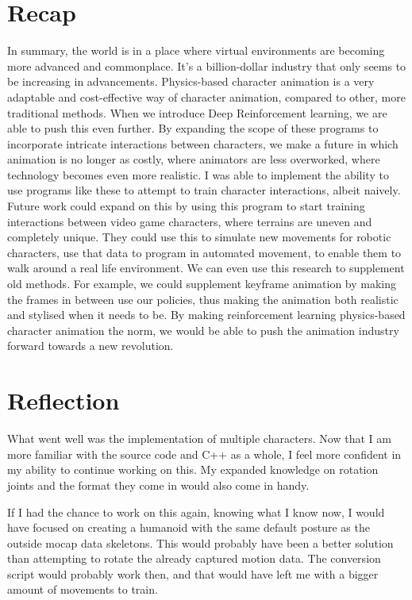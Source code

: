 \documentclass{l4proj}
\begin{document}
\section{Recap}
In summary, the world is in a place where virtual environments are becoming more advanced and commonplace. It's a billion-dollar industry that only seems to be increasing in advancements. Physics-based character animation is a very adaptable and cost-effective way of character animation, compared to other, more traditional methods. When we introduce Deep Reinforcement learning, we are able to push this even further. By expanding the scope of these programs to incorporate intricate interactions between characters, we make a future in which animation is no longer as costly, where animators are less overworked, where technology becomes even more realistic. I was able to implement the ability to use programs like these to attempt to train character interactions, albeit naively. Future work could expand on this by using this program to start training interactions between video game characters, where terrains are uneven and completely unique. They could use this to simulate new movements for robotic characters, use that data to program in automated movement, to enable them to walk around a real life environment. We can even use this research to supplement old methods. For example, we could supplement keyframe animation by making the frames in between use our policies, thus making the animation both realistic and stylised when it needs to be. By making reinforcement learning physics-based character animation the norm, we would be able to push the animation industry forward towards a new revolution.

\section{Reflection}
What went well was the implementation of multiple characters. Now that I am more familiar with the source code and C++ as a whole, I feel more confident in my ability to continue working on this. My expanded knowledge on rotation joints and the format they come in would also come in handy.

If I had the chance to work on this again, knowing what I know now, I would have focused on creating a humanoid with the same default posture as the outside mocap data skeletons. This would probably have been a better solution than attempting to rotate the already captured motion data. The conversion script would probably work then, and that would have left me with a bigger amount of movements to train.
\end{document}
